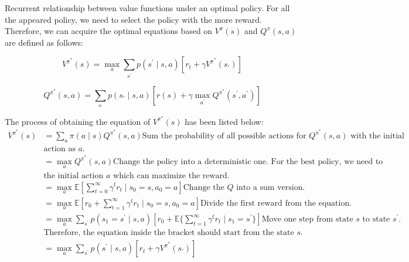 \documentclass[11pt]{article}
\begin{document}
Recurrent relationship between value functions under an optimal policy. For all the appeared policy, we need to select the policy with the more reward.
%
Therefore, we can acquire the optimal equations based on $V^{\pi}(s)$ and $Q^{\pi}(s, a)$ are defined as follows: 

$$V^{\pi^{*}}(s) = \max_{a} \sum_{s^{'}} p(s^{'}\mid s,a) \left[r_t + \gamma V^{\pi^{*}}(s_{'})\right]$$

$$Q^{\pi^{*}}(s, a) = \sum_{s_{'}} p\left(s_{'}\mid s,a\right) \left[r(s) + \gamma \max_{a^{'}} Q^{\pi^{*}}(s^{'}, a^{'})\right]$$

The process of obtaining the equation of $V^{\pi^{*}}(s)$ has been listed below: 
\begin{align*}
V^{\pi^{*}}(s) &=\sum_{a} \pi(a\mid s) Q^{\pi^{*}}(s, a) \text{Sum the probability of all possible actions for $Q^{\pi^{*}}(s, a)$ with the initial } \\ & \text{action as $a$.} \\
&=\max_{a} Q^{\pi^{*}}(s, a) \text{Change the policy into a deterministic one. For the best policy, we need to select } \\ & \text{the initial action $a$ which can maximize the reward.} \\
&=\max_{a} \mathbb{E}\left[\sum_{t=0}^{\infty} \gamma^{t} r_{t} \mid s_{0}=s, a_{0}=a \right] \text{Change the $Q$ into a sum version.} \\
&=\max_{a} \mathbb{E}\left[r_0 + \sum_{t=1}^{\infty} \gamma^{t} r_{t} \mid s_{0}=s, a_{0}=a \right] \text{Divide the first reward from the equation.} \\
&=\max_{a} \sum_{s^{'}}p(s_1=s^{'} \mid s,a)\left[r_0 + \mathbb{E}\{\sum_{t=1}^{\infty} \gamma^{t} r_{t} \mid s_{1}=s^{'}\}\right] \text{Move one step from state $s$ to state $s^{'}$. } \\ & \text{Therefore, the equation inside the bracket should start from the state $s_{'}$} \\
&= \max_{a} \sum_{s^{'}} p(s^{'}\mid s,a) \left[r_t + \gamma V^{\pi^{*}}(s_{'})\right]
\end{align*}

{


}
\end{document}
